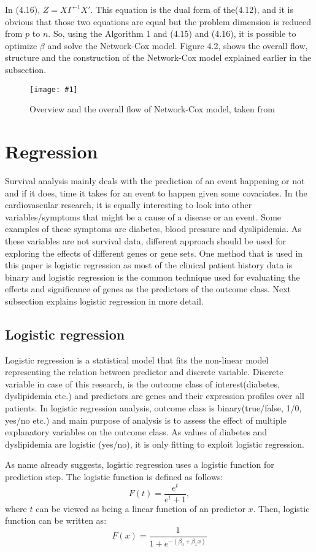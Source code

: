 \documentclass{ba-kecs}
\numberwithin{figure}{section}
\numberwithin{equation}{section}
\newcommand{\dkepic}[2]{ %
	\begin{figure}[H] %
	\centerline{\texttt{[image: \#1]}}
	\caption{#2}
	\label{#1}
	\end{figure}
}
\begin{document}
In (4.16), $Z = X\Gamma^{-1}X'$. This equation is the dual form of the(4.12), and it is obvious that those two equations are equal but the problem dimension is reduced from $p$ to $n$. So, using the Algorithm 1 and (4.15) and (4.16), it is possible to optimize $\beta$ and solve the Network-Cox model. Figure 4.2, shows the overall flow, structure and the construction of the Network-Cox model explained earlier in the subsection.

\dkepic{netcox}{Overview and the overall flow of Network-Cox model, taken from \cite{netcox}}


\section{Regression}
Survival analysis mainly deals with the prediction of an event happening or not and if it does, time it takes for an event to happen given some covariates. In the cardiovascular research, it is equally interesting to look into other variables/symptoms that might be a cause of a disease or an event. Some examples of these symptoms are diabetes, blood pressure and dyslipidemia. As these variables are not survival data, different approach should be used for exploring the effects of different genes or gene sets. One method that is used in this paper is logistic regression as most of the clinical patient history data is binary and logistic regression is the common technique used for evaluating the effects and significance of genes as the predictors of the outcome class. Next subsection explains logistic regression in more detail.

\subsection{Logistic regression}
Logistic regression is a statistical model that fits the non-linear model representing the relation between predictor and discrete variable. Discrete variable in case of this research, is the outcome class of interest(diabetes, dyslipidemia etc.) and predictors are genes and their expression profiles over all patients. In logistic regression analysis, outcome class is binary(true/false, 1/0, yes/no etc.) and main purpose of analysis is to assess the effect of multiple explanatory variables on the outcome class. As values of diabetes and dyslipidemia are logistic (yes/no), it is only fitting to exploit logistic regression.

As name already suggests, logistic regression uses a logistic function for prediction step. The logistic function is defined as follows:
\begin{equation}
F(t) = \dfrac{e^{t}}{e^{t} + 1},
\end{equation}
where $t$ can be viewed as being a linear function of an predictor $x$. Then, logistic function can be written as:
\begin{equation}
F(x) = \dfrac{1}{1 + e^{-(\beta_{0} + \beta_{1}x)}}
\end{equation}
\end{document}
